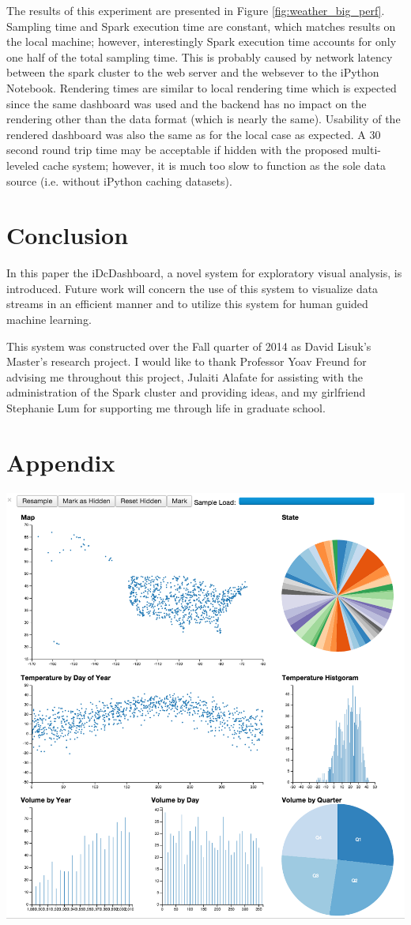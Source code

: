 \documentclass[letter,twocolumn]{article}
\begin{document}
The results of this experiment are presented in Figure \ref{fig:weather_big_perf}.
Sampling time and Spark execution time are constant, which matches results on the local machine;
however, interestingly Spark execution time accounts for only one half of the total sampling time.  
This is probably caused by network latency between the spark cluster to the web server and the websever to the iPython Notebook.
Rendering times are similar to local rendering time which is expected since the same dashboard was used and the backend has no impact on the rendering other than the data format (which is nearly the same).
Usability of the rendered dashboard was also the same as for the local case as expected.
A 30 second round trip time may be acceptable if hidden with the proposed multi-leveled cache system; however, it is much too slow to function as the sole data source (i.e. without iPython caching datasets).

\section{Conclusion}\label{sec:conclusion}%

In this paper the iDcDashboard, a novel system for exploratory visual analysis, is introduced.
Future work will concern the use of this system to visualize data streams in an efficient manner and to utilize this system for human guided machine learning.

This system was constructed over the Fall quarter of 2014 as David Lisuk's Master's research project.
I would like to thank Professor Yoav Freund for advising me throughout this project, Julaiti Alafate for assisting with the administration of the Spark cluster and providing ideas, and my girlfriend Stephanie Lum for supporting me through life in graduate school.


\onecolumn

\section{Appendix}
\centering
\includegraphics[width=6in]{figs/weather_dashboard.png}
\label{fig:weather}
\end{document}

